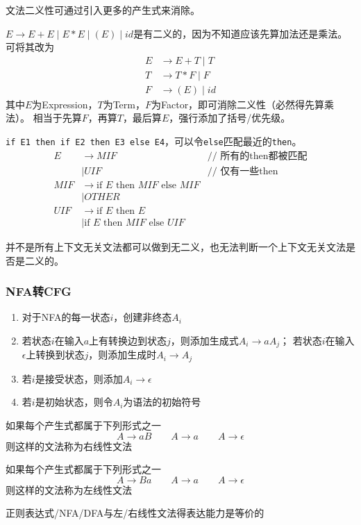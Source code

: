 文法二义性可通过引入更多的产生式来消除。
\begin{example}
$E\to E+E\mid E*E\mid (E)\mid id$是有二义的，因为不知道应该先算加法还是乘法。
可将其改为
\[\begin{aligned}
E &\to E+T\mid T\\
T &\to T*F\mid F\\
F &\to (E)\mid id
\end{aligned}\]
其中$E$为Expression，$T$为Term，$F$为Factor，即可消除二义性（必然得先算乘法）。
相当于先算$F$，再算$T$，最后算$E$，强行添加了括号/优先级。
\end{example}
\begin{example}
\verb'if E1 then if E2 then E3 else E4'，可以令\verb'else'匹配最近的\verb'then'。
\[\begin{array}{rll}
E &\to MIF &\text{// 所有的then都被匹配}\\
  &\mid UIF &\text{// 仅有一些then}\\
MIF &\to \text{if } E \text{ then } MIF \text{ else } MIF &\\
  &\mid OTHER &\\
UIF &\to \text{if } E \text{ then } E &\\
  &\mid \text{if } E \text{ then } MIF \text{ else } UIF &
\end{array}\]
\end{example}

并不是所有上下文无关文法都可以做到无二义，也无法判断一个上下文无关文法是否是二义的。

\subsubsection{NFA转CFG}
\begin{enumerate}
	\item 对于NFA的每一状态$i$，创建非终态$A_i$
	\item 若状态$i$在输入$a$上有转换边到状态$j$，则添加生成式$A_i\to aA_j$；
	若状态$i$在输入$\epsilon$上转换到状态$j$，则添加生成时$A_i\to A_j$
	\item 若$i$是接受状态，则添加$A_i\to\epsilon$
	\item 若$i$是初始状态，则令$A_i$为语法的初始符号
\end{enumerate}

\begin{definition}[右线性文法]
如果每个产生式都属于下列形式之一
\[A\to aB\qquad A\to a\qquad A\to\epsilon\]
则这样的文法称为右线性文法
\end{definition}
\begin{definition}[左线性文法]
如果每个产生式都属于下列形式之一
\[A\to Ba\qquad A\to a\qquad A\to\epsilon\]
则这样的文法称为左线性文法
\end{definition}
\begin{theorem}
正则表达式/NFA/DFA与左/右线性文法得表达能力是等价的
\end{theorem}

